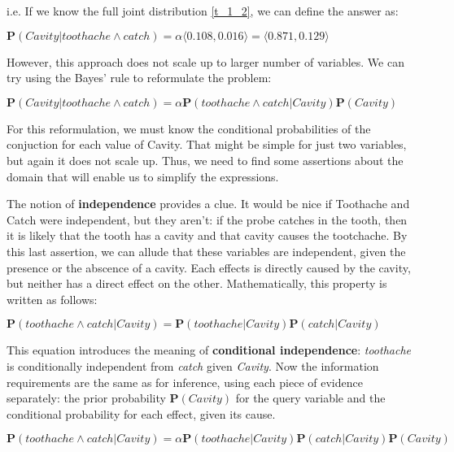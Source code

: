 \begin{example}
    i.e. If we know the full joint distribution \ref{t_1_2}, we can define the answer as: \vspace{3.5pt}
    
    $\mathbf{P}(Cavity|toothache \wedge catch) = \alpha \langle0.108, 0.016\rangle = \langle0.871, 0.129\rangle$ \vspace{3.5pt}

    However, this approach does not scale up to larger number of variables. We can try using the Bayes' rule to reformulate the problem: \vspace{3.5pt}

    $\mathbf{P}(Cavity|toothache \wedge catch) = \alpha\mathbf{P}(toothache \wedge catch|Cavity)\mathbf{P}(Cavity)$ \vspace{3.5pt}

    For this reformulation, we must know the conditional probabilities of the conjuction for each value of Cavity. That might be simple for just two variables, but again it does not scale up.
    Thus, we need to find some assertions about the domain that will enable us to simplify the expressions. \vspace{3.5pt}

    The notion of \textbf{independence} provides a clue. It would be nice if Toothache and Catch were independent, but they aren't: if the probe catches in the tooth, then it is likely that the tooth has a cavity and that cavity causes the tootchache. By this last assertion, we can allude that these variables are independent, given the presence or the abscence of a cavity. Each effects is directly caused by the cavity, but neither has a direct effect on the other. Mathematically, this property is written as follows: \vspace{3.5pt}
    \begin{center}
        $\mathbf{P}(toothache \wedge catch | Cavity) = \mathbf{P}(toothache|Cavity)\mathbf{P}(catch|Cavity)$
    \end{center} \vspace{3.5pt}
    This equation introduces the meaning of \textbf{conditional independence}: \textit{toothache} is conditionally independent from \textit{catch} given \textit{Cavity}. Now the information requirements are the same as for inference, using each piece of evidence separately: the prior probability $\mathbf{P}(Cavity)$ for the query variable and the conditional probability for each effect, given its cause. \vspace{3.5pt}
    \begin{center}
        $\mathbf{P}(toothache \wedge catch | Cavity) = \alpha \mathbf{P}(toothache|Cavity)\mathbf{P}(catch|Cavity)\mathbf{P}(Cavity)$
    \end{center} \vspace{3.5pt}
\end{example}
